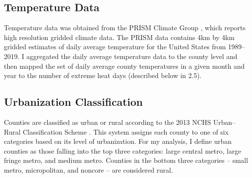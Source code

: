 \documentclass[12pt, a4paper]{article}
\begin{document}
\subsection{Temperature Data}
Temperature data was obtained from the PRISM Climate Group \cite{prismClimate2022}, which reports high resolution gridded climate data. The PRISM data contains 4km by 4km gridded estimates of daily average temperature for the United States from 1989--2019. I aggregated the daily average temperature data to the county level and then mapped the set of daily average county temperatures in a given month and year to the number of extreme heat days (described below in 2.5).

\subsection{Urbanization Classification}
Counties are classified as urban or rural according to the 2013 NCHS Urban--Rural Classification Scheme \cite{nchsUrbanRural2013}. This system assigns each county to one of six categories based on its level of urbanization. For my analysis, I define urban counties as those falling into the top three categories: large central metro, large fringe metro, and medium metro. Counties in the bottom three categories -- small metro, micropolitan, and noncore -- are considered rural.
\end{document}
